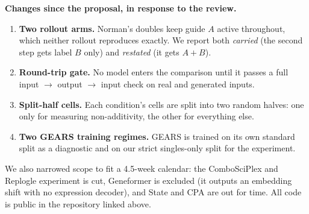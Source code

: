\noindent\textbf{Changes since the proposal, in response to the review.}
\begin{enumerate}[nosep]
  \item \textbf{Two rollout arms.} Norman's doubles keep guide $A$ active throughout, which
  neither rollout reproduces exactly. We report both \emph{carried} (the second step gets
  label $B$ only) and \emph{restated} (it gets $A{+}B$).
  \item \textbf{Round-trip gate.} No model enters the comparison until it passes a full
  input $\to$ output $\to$ input check on real and generated inputs.
  \item \textbf{Split-half cells.} Each condition's cells are split into two random halves:
  one only for measuring non-additivity, the other for everything else.
  \item \textbf{Two GEARS training regimes.} GEARS is trained on its own standard split as a
  diagnostic and on our strict singles-only split for the experiment.
\end{enumerate}
We also narrowed scope to fit a 4.5-week calendar: the ComboSciPlex and Replogle experiment
is cut, Geneformer is excluded (it outputs an embedding shift with no expression decoder),
and State and CPA are out for time. All code is public in the repository linked above.

